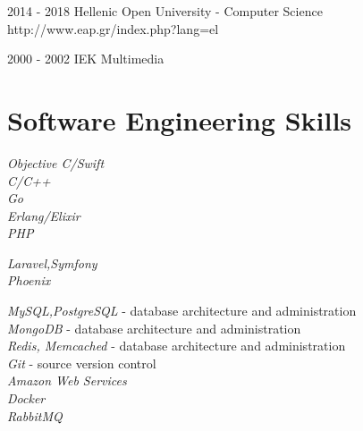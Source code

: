 \documentclass[10pt]{article}
\begin{document}
\education
{2014 - 2018}{}
{Hellenic Open University - Computer Science}
{http://www.eap.gr/index.php?lang=el}


\education
{2000 - 2002}{}
{IEK Multimedia}
{}




\section{Software Engineering Skills}

{
\textit{Objective C/Swift}\\
\textit{C/C++}\\
\textit{Go}\\
\textit{Erlang/Elixir}\\
\textit{PHP}\\
}


{
\textit{Laravel,Symfony}\\
\textit{Phoenix}\\
}


{
\textit{MySQL,PostgreSQL} - database architecture and administration\\
\textit{MongoDB} - database architecture and administration\\
\textit{Redis, Memcached} - database architecture and administration\\
\textit{Git} - source version control\\
\textit{Amazon Web Services}\\
\textit{Docker}\\
\textit{RabbitMQ}\\
}
\end{document}
